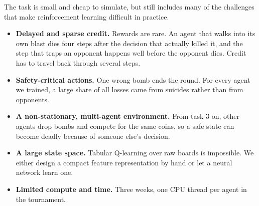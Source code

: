 \documentclass[11pt]{article}
\newcommand{\code}[1]{\texttt{#1}}
\begin{document}
The task is small and cheap to simulate, but still includes many of the challenges that make reinforcement learning difficult in practice.
\begin{itemize}
  \item \textbf{Delayed and sparse credit.} Rewards are rare. An agent that walks into its
        own blast dies four steps after the decision that actually killed it, and the step
        that traps an opponent happens well before the opponent dies. Credit has to travel
        back through several steps.
  \item \textbf{Safety-critical actions.} One wrong bomb ends the round. For every agent we
        trained, a large share of all losses came from suicides rather than from opponents.
  \item \textbf{A non-stationary, multi-agent environment.} From task 3 on, other agents
        drop bombs and compete for the same coins, so a safe state can become deadly
        because of someone else's decision.
  \item \textbf{A large state space.} Tabular Q-learning over raw boards is impossible. We
        either design a compact feature representation by hand or let a neural network
        learn one.
  \item \textbf{Limited compute and time.} Three weeks, one CPU thread per agent in the
        tournament.
\end{itemize}

\newpage

\end{document}
